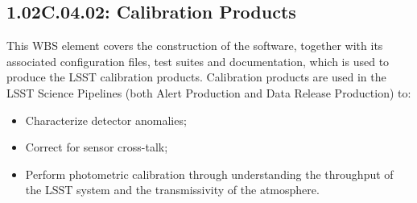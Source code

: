 \subsection{1.02C.04.02: Calibration Products}

This WBS element covers the construction of the software, together with
its associated configuration files, test suites and documentation, which
is used to produce the LSST calibration products. Calibration products
are used in the LSST Science Pipelines (both Alert Production and Data
Release Production) to:

\begin{itemize}

\item{Characterize detector anomalies;}
\item{Correct for sensor cross-talk;}
\item{Perform photometric calibration through understanding the throughput of
      the LSST system and the transmissivity of the atmosphere.}

\end{itemize}
